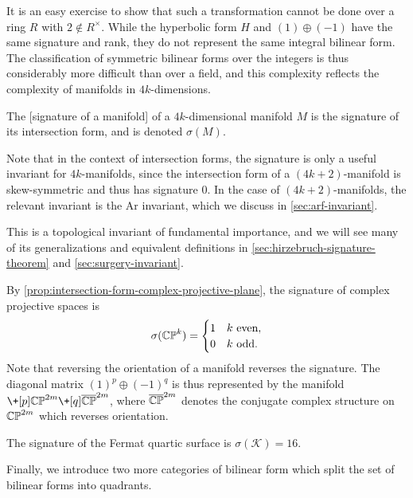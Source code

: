 It is an easy exercise to show that such a transformation cannot be done over a ring $R$ with $2\not\in R^\times$. While the hyperbolic form $H$ and $(1)\oplus (-1)$ have the same signature and rank, they do not represent the same integral bilinear form. 
The classification of symmetric bilinear forms over the integers is thus considerably more difficult than over a field, and this complexity reflects the complexity of manifolds in $4k$-dimensions.

\begin{definition}
	The [signature of a manifold] of a $4k$-dimensional manifold $M$ is the signature of its intersection form, and is denoted $\sigma(M)$.
\end{definition}

\begin{remark}
	Note that in the context of intersection forms, the signature is only a useful invariant for $4k$-manifolds, since the intersection form of a $(4k+2)$-manifold is skew-symmetric and thus has signature $0$. In the case of $(4k+2)$-manifolds, the relevant invariant is the Ar invariant, which we discuss in \cref{sec:arf-invariant}.
\end{remark}

This is a topological invariant of fundamental importance, and we will see many of its generalizations and equivalent definitions in \cref{sec:hirzebruch-signature-theorem} and \cref{sec:surgery-invariant}.

\begin{example}
	By \cref{prop:intersection-form-complex-projective-plane}, the signature of complex projective spaces is
	\[
		\sigma(\mathbb{CP}^k)=\begin{cases}1 & k\textrm{ even},\\ 0 & k\textrm{ odd}.\end{cases}
	\]
Note that reversing the orientation of a manifold reverses the signature. The diagonal matrix $(1)^p\oplus (-1)^q$ is thus represented by the manifold $\+[p] \CP^{2m} \+[q] \overline{\CP}^{2m}$, where $\overline{\mathbb{CP}}^{2m}$ denotes the conjugate complex structure on $\mathbb{CP}^{2m}$ which reverses orientation.
\end{example}

\begin{example}
		The signature of the Fermat quartic surface is $\sigma(\mathcal{K})=16$.
\end{example}

Finally, we introduce two more categories of bilinear form which split the set of bilinear forms into quadrants.

